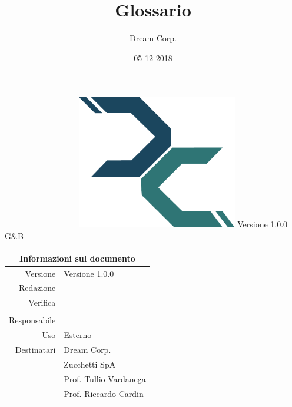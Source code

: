 \documentclass[12pt]{article}
\title{\fontsize{40}{40}\selectfont Glossario}
\author{Dream Corp.}
\date{05-12-2018}
\newcommand{\red}{\daL}
\newcommand{\verp}{\mic}
\newcommand{\vers}{\gia}
\newcommand{\res}{\daL}
\newcommand{\version}{Versione 1.0.0}
\newcommand{\use}{Esterno}
\begin{document}
    
\maketitle
\begin{center}
	~~~~~~~~~~~~~~~~~~\includegraphics[width = 70mm]{logo.png}\newline
	\huge \version 
	\\G\&B
	
	\begin{table}[h!]
		\centering
		\begin{tabular}{r|l}
			\multicolumn{2}{c}{Informazioni sul documento}\\
			\hline
			Versione & \version \\
			Redazione & \red \\
			Verifica & \verp\\
			& \vers\\
			Responsabile & \res\\
			Uso & \use\\
			Destinatari & Dream Corp. \\
			& Zucchetti SpA\\
			& Prof. Tullio Vardanega\\
			& Prof. Riccardo Cardin\\
		\end{tabular}
	\end{table}
	
\end{center}
\newpage

    \clearpage
    \glsaddall

    \printglossary[title=Glossario,toctitle=Glossario,nonumberlist]
\end{document}
